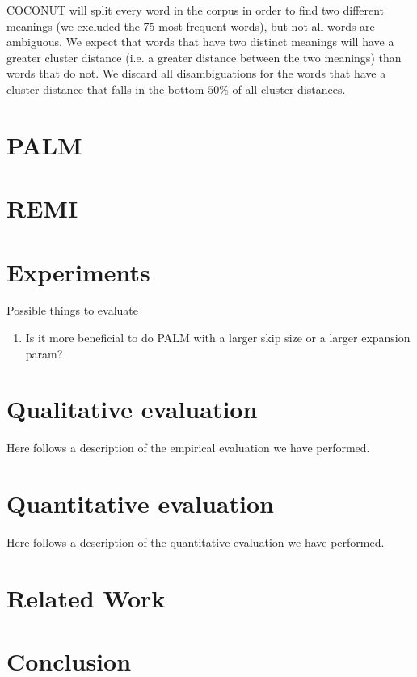 \documentclass[11pt]{article}
\begin{document}
COCONUT will split every word in the corpus in order to find two different meanings (we excluded the 75 most frequent words), but not all words are ambiguous. We expect that words that have two distinct meanings will have a greater cluster distance (i.e. a greater distance between the two meanings) than words that do not. We discard all disambiguations for the words that have a cluster distance that falls in the bottom $50\%$ of all cluster distances.

\section{PALM}

\section{REMI}

\section{Experiments}
Possible things to evaluate 
\begin{enumerate}
\item Is it more beneficial to do PALM with a larger skip size or a larger expansion param?
\end{enumerate}
\section{Qualitative evaluation}
Here follows a description of the empirical evaluation we have performed.

\section{Quantitative evaluation}
Here follows a description of the quantitative evaluation we have performed.

\section{Related Work}
\section{Conclusion}



\end{document}
